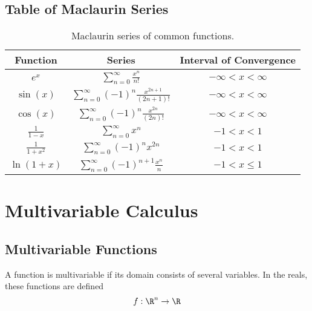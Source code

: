 \documentclass{article}
\begin{document}
\subsection{Table of Maclaurin Series}
\begin{table}[H]
    \centering
    \begin{tabular}{c c c}
        \toprule
        \textbf{Function}                         & \textbf{Series}                                                                                 & \textbf{Interval of Convergence} \\
        \midrule
        \(e^{x}\)                                 & \(\displaystyle \sum_{n=0}^{\infty} \frac{x^n}{n!}\)                                            & \(-\infty < x < \infty\)         \\[14pt]
        \(\sin{\left( x \right)}\)                & \(\displaystyle \sum_{n=0}^{\infty} \left( -1 \right)^n \frac{x^{2n+1}}{\left( 2n+1 \right)!}\) & \(-\infty < x < \infty\)         \\[14pt]
        \(\cos{\left( x \right)}\)                & \(\displaystyle \sum_{n=0}^{\infty} \left( -1 \right)^n \frac{x^{2n}}{\left( 2n \right)!}\)     & \(-\infty < x < \infty\)         \\[14pt]
        \(\displaystyle \frac{1}{1-x}\)           & \(\displaystyle \sum_{n=0}^{\infty} x^n\)                                                       & \(-1 < x < 1\)                   \\[14pt]
        \(\displaystyle \frac{1}{1+x^2}\)         & \(\displaystyle \sum_{n=0}^{\infty} \left( -1 \right)^n x^{2n}\)                                & \(-1 < x < 1\)                   \\[14pt]
        \(\displaystyle \ln{\left( 1+x \right)}\) & \(\displaystyle \sum_{n=0}^{\infty} \left( -1 \right)^{n+1} \frac{x^n}{n}\)                     & \(-1 < x \leq 1\)                \\[14pt]
        \bottomrule
    \end{tabular}
    \caption{Maclaurin series of common functions.}
\end{table}
\newpage
\section{Multivariable Calculus}
\subsection{Multivariable Functions}
\begin{definition}
    A function is multivariable if its domain consists of several
    variables. In the reals, these functions are defined
    \begin{equation*}
        f:\R^n\to\R
    \end{equation*}
\end{definition}
\end{document}
